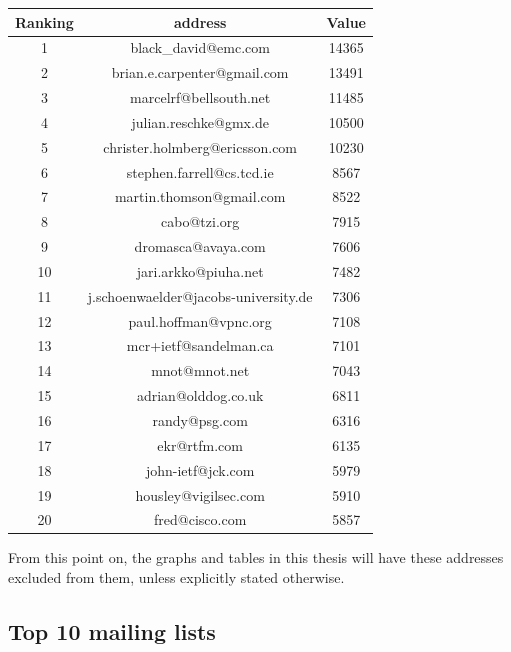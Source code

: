 \documentclass[a4paper,english]{report}
\begin{document}
\begin{center}
 \begin{tabular}{|c | c | c|}
 \hline
Ranking & address & Value \\ [0.5ex]
 \hline\hline
 1 & black\_david@emc.com & 14365\\
  \hline
 2 & brian.e.carpenter@gmail.com & 13491\\
  \hline
 3 & marcelrf@bellsouth.net & 11485\\
  \hline
 4 & julian.reschke@gmx.de & 10500\\
  \hline
 5 & christer.holmberg@ericsson.com & 10230\\
  \hline
 6 & stephen.farrell@cs.tcd.ie & 8567\\
  \hline
 7 & martin.thomson@gmail.com & 8522\\
  \hline
 8 & cabo@tzi.org & 7915\\
  \hline
 9 & dromasca@avaya.com & 7606\\
  \hline
 10 & jari.arkko@piuha.net & 7482\\
  \hline
 11 & j.schoenwaelder@jacobs-university.de & 7306\\
  \hline
 12 & paul.hoffman@vpnc.org & 7108\\
  \hline
 13 & mcr+ietf@sandelman.ca & 7101\\
  \hline
 14 & mnot@mnot.net & 7043\\
  \hline
 15 & adrian@olddog.co.uk & 6811\\
  \hline
 16 & randy@psg.com & 6316\\
  \hline
 17 & ekr@rtfm.com & 6135\\
  \hline
 18 & john-ietf@jck.com & 5979\\
  \hline
 19 & housley@vigilsec.com & 5910\\
  \hline
 20 & fred@cisco.com & 5857\\
  \hline
\end{tabular}
\end{center}

From this point on, the graphs and tables in this thesis will have these addresses excluded from them, unless explicitly stated otherwise.

\subsection{Top 10 mailing lists}
\end{document}
